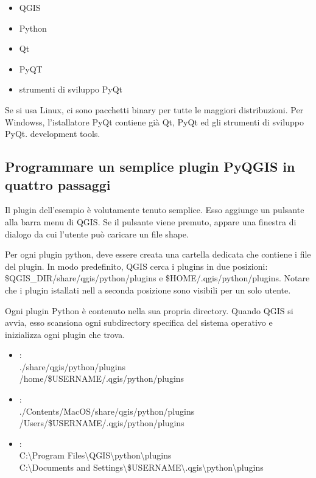 \begin{itemize}
\item QGIS
\item Python
\item Qt
\item PyQT
\item strumenti di sviluppo PyQt
\end{itemize}

Se si usa Linux, ci sono pacchetti binary per tutte le maggiori distribuzioni. Per Windowss, l'istallatore PyQt contiene già Qt, PyQt ed gli strumenti di sviluppo PyQt.
development tools.

\subsection{Programmare un semplice plugin PyQGIS in quattro passaggi}\label{subsec:pyfoursteps}

Il plugin dell'esempio è volutamente tenuto semplice. Esso aggiunge un pulsante alla barra menu di QGIS. Se il pulsante viene premuto, appare una finestra di dialogo da cui l'utente può caricare un file shape.

Per ogni plugin python, deve essere creata una cartella dedicata che contiene i file del plugin. In modo predefinito, QGIS cerca i plugins in due posizioni: \$QGIS\_DIR/share/qgis/python/plugins e \$HOME/.qgis/python/plugins.
Notare che i plugin istallati nell a seconda posizione sono visibili per un solo utente.


Ogni plugin Python è contenuto nella sua propria directory. Quando QGIS si avvia, esso scansiona ogni subdirectory specifica del sistema operativo e inizializza ogni plugin che trova.

\begin{itemize}
\item {}:\\
./share/qgis/python/plugins \\
/home/\$USERNAME/.qgis/python/plugins
\item {}:\\
./Contents/MacOS/share/qgis/python/plugins \\
/Users/\$USERNAME/.qgis/python/plugins
\item {}:\\
C:\textbackslash Program Files\textbackslash QGIS\textbackslash python\textbackslash plugins \\
C:\textbackslash Documents and Settings\textbackslash\$USERNAME\textbackslash .qgis\textbackslash python\textbackslash plugins

\end{itemize}


